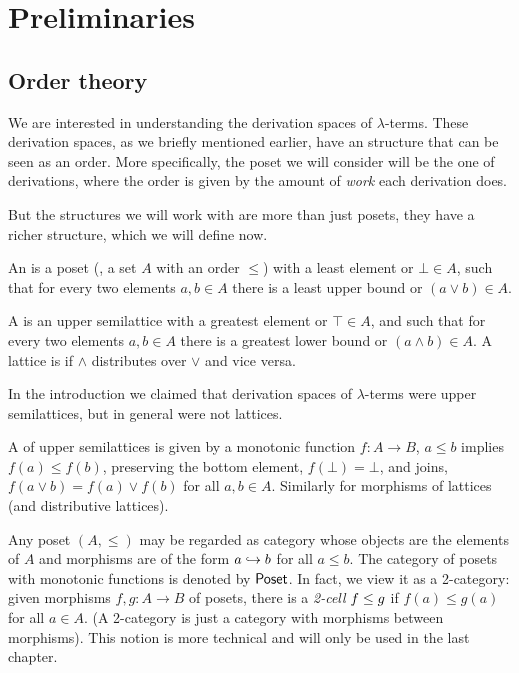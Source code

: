 
\chapter{Preliminaries}

\section{Order theory}
We are interested in understanding the derivation spaces
of $\lambda$-terms.
These derivation spaces, as we briefly mentioned earlier, have an structure that can be seen as an order.
More specifically, the poset we will consider will be the one of derivations, where the order is given by
the amount of \textit{work} each derivation does.

But the structures we will work with are more than just posets, they have a richer structure,
which we will define now.

An  is a poset (\ie, a set $A$ with an order $\leq$)
with a least element or  $\bot \in A$,
such that for every two elements $a, b \in A$
there is a least upper bound or  $(a \lor b) \in A$.


A  is an upper semilattice
with a greatest element or  $\top \in A$,
and such that for every two elements $a, b \in A$
there is a greatest lower bound or  $(a \land b) \in A$.
A lattice is  if $\land$ distributes over $\lor$ and vice versa.

In the introduction we claimed that derivation spaces of $\lambda$-terms were
upper semilattices, but in general were not lattices.

A  of upper semilattices
is given by a monotonic function $f : A \to B$,
\ie $a \leq b$ implies $f(a) \leq f(b)$,
preserving the bottom element, \ie $f(\bot) = \bot$,
and joins, \ie $f(a \lor b) = f(a) \lor f(b)$ for all $a, b \in A$.
Similarly for morphisms of lattices (and distributive lattices).

Any poset $(A,\leq)$ may be regarded as category whose objects are the elements of $A$
and morphisms are of the form $\pt{b}{a}$ for all $a \leq b$. 
The category of posets with monotonic functions is denoted by $\Poset$.
In fact, we view it as a 2-category:
given morphisms $f,g : A \to B$ of posets,
there is a \textit{2-cell} $f \totwocell g$ if $f(a) \leq g(a)$ for all $a \in A$.
(A 2-category is just a category with morphisms between morphisms).
This notion is more technical and will only be used in the last chapter.


